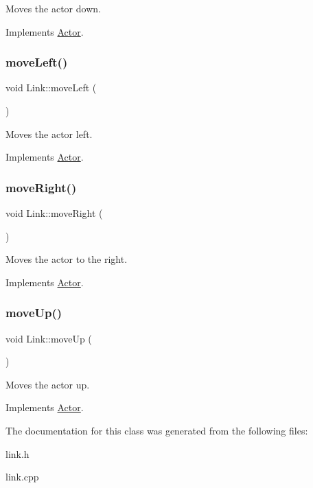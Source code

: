 Moves the actor down. 



Implements \mbox{\hyperlink{classActor_ad2737cd62ea0c96f75853afb5d1fd83a}{Actor}}.

\mbox{\label{classLink_a682bab2dc3f967e35a67dcc74c1d4722}} 
\subsubsection{\texorpdfstring{moveLeft()}{moveLeft()}}
{\footnotesize\ttfamily void Link\+::move\+Left (\begin{DoxyParamCaption}{ }\end{DoxyParamCaption})\hspace{0.3cm}{\ttfamily [virtual]}}



Moves the actor left. 



Implements \mbox{\hyperlink{classActor_a522d6069bacaa9985db7a234bde2c8b6}{Actor}}.

\mbox{\label{classLink_aa1d60136a88be20a14179a5760ed91da}} 
\subsubsection{\texorpdfstring{moveRight()}{moveRight()}}
{\footnotesize\ttfamily void Link\+::move\+Right (\begin{DoxyParamCaption}{ }\end{DoxyParamCaption})\hspace{0.3cm}{\ttfamily [virtual]}}



Moves the actor to the right. 



Implements \mbox{\hyperlink{classActor_a9176d8f8ec68fcbd91c48223e7c65775}{Actor}}.

\mbox{\label{classLink_a850a1e6c7a68d921b36d30dc918a7668}} 
\subsubsection{\texorpdfstring{moveUp()}{moveUp()}}
{\footnotesize\ttfamily void Link\+::move\+Up (\begin{DoxyParamCaption}{ }\end{DoxyParamCaption})\hspace{0.3cm}{\ttfamily [virtual]}}



Moves the actor up. 



Implements \mbox{\hyperlink{classActor_afaa299f90233461ee4df96dcfda3008a}{Actor}}.



The documentation for this class was generated from the following files\+:\begin{DoxyCompactItemize}
\item 
link.\+h\item 
link.\+cpp\end{DoxyCompactItemize}
